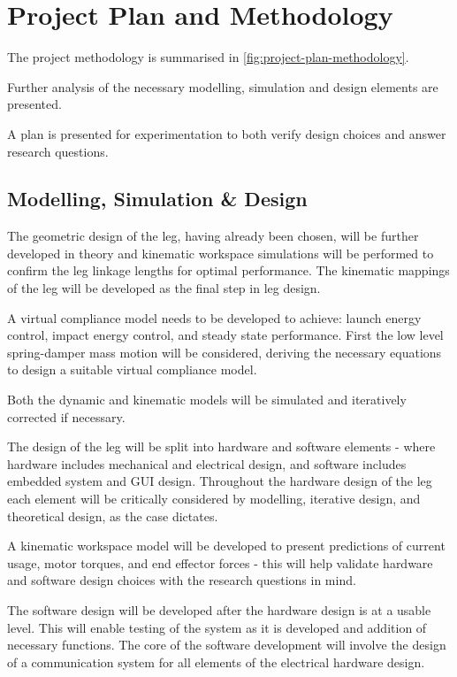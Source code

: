 \chapter{Project Plan and Methodology}

The project methodology is summarised in \cref{fig:project-plan-methodology}. 

Further analysis of the necessary modelling, simulation and design elements are presented.

A plan is presented for experimentation to both verify design choices and answer research questions.

\section{Modelling, Simulation \& Design}

The geometric design of the leg, having already been chosen, will be further developed in theory and kinematic workspace simulations will be performed to confirm the leg linkage lengths for optimal performance. The kinematic mappings of the leg will be developed as the final step in leg design.

A virtual compliance model needs to be developed to achieve: launch energy control, impact energy control, and steady state performance. First the low level spring-damper mass motion will be considered, deriving the necessary equations to design a suitable virtual compliance model.

Both the dynamic and kinematic models will be simulated and iteratively corrected if necessary.

The design of the leg will be split into hardware and software elements - where hardware includes mechanical and electrical design, and software includes embedded system and GUI design. Throughout the hardware design of the leg each element will be critically considered by modelling, iterative design, and theoretical design, as the case dictates. 

A kinematic workspace model will be developed to present predictions of current usage, motor torques, and end effector forces - this will help validate hardware and software design choices with the research questions in mind.

The software design will be developed after the hardware design is at a usable level. This will enable testing of the system as it is developed and addition of necessary functions. The core of the software development will involve the design of a communication system for all elements of the electrical hardware design.

